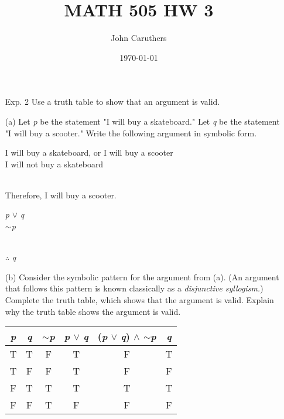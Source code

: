\documentclass{article}
\title{MATH 505 HW 3}
\author{John Caruthers}
\date\today
\begin{document}
\maketitle

\begin{itemize}
    \item[Exp. 2] Use a truth table to show that an argument is valid.
    
    (a) Let \emph{p} be the statement "I will buy a skateboard." Let \emph{q} be the statement "I will buy a scooter." Write the following argument in symbolic form.
    
    \hspace*{1cm} I will buy a skateboard, or I will buy a scooter\\
    \hspace*{1cm} I will not buy a skateboard\\
    \\
    \hspace*{1cm} Therefore, I will buy a scooter.
    
    \hspace*{1cm} {\color{blue} \emph{p} $\vee$ \emph{q}}\\
    \hspace*{1cm} {\color{blue} $\sim$\emph{p}}\\
    \\
    \hspace*{1cm} {\color{blue} $\therefore$ \emph{q}}
    
    (b) Consider the symbolic pattern for the argument from (a). (An argument that follows this pattern is known classically as a \emph{disjunctive syllogism.}) Complete the truth table, which shows that the argument is valid. Explain why the truth table shows the argument is valid.
    
    \begin{center}
        \begin{tabular}{|c|c|c|c|c|c|}
            \hline
            \emph{p} & \emph{q} & $\sim$\emph{p} & \emph{p} $\vee$ \emph{q} & (\emph{p} $\vee$ \emph{q}) $\wedge$ $\sim$\emph{p} & \emph{q}\\
            \hline
            T & T & F & T & F & T\\
            \hline
            T & F & F & T & F & F \\
            \hline
            \rowcolor{LightCyan}
            F & T & T & T & T & T \\
            \hline
            F & F & T & F & F & F \\
            \hline
        \end{tabular}
    \end{center}
    

\end{itemize}
\end{document}
